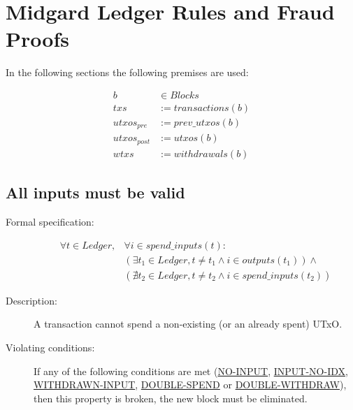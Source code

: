 \documentclass[../midgard.tex]{subfiles}
\begin{document}
\section{Midgard Ledger Rules and Fraud Proofs}
\label{h:ledger-rules-fraud-proofs}

In the following sections the following premises are used:

\begin{equation*}
\begin{split}
           b & \in Blocks          \\
         txs & := transactions(b)  \\
 utxos_{pre} & := prev\_utxos(b)   \\
utxos_{post} & := utxos(b)         \\
        wtxs & := withdrawals(b)
\end{split}
\end{equation*}

\subsection{All inputs must be valid}
\label{rule:all-inputs-must-be-valid}

\begin{description}

\item[Formal specification:]
\begin{equation*}
\begin{split}
    \forall t \in Ledger, &\forall i \in spend\_inputs(t): \\
    &( \exists t_1 \in Ledger, t \neq t_1 \land i \in outputs(t_1) ) \land \\
    &( \nexists t_2 \in Ledger, t \neq t_2 \land i \in spend\_inputs(t_2) )
\end{split}
\end{equation*}

\item[Description:] A transaction cannot spend a non-existing (or an already spent) UTxO.
\item[Violating conditions:] If any of the following conditions are met (\hyperref[violation:NO-INPUT]{NO-INPUT}, \hyperref[violation:INPUT-NO-IDX]{INPUT-NO-IDX}, \hyperref[violation:WITHDRAWN-INPUT]{WITHDRAWN-INPUT}, \hyperref[violation:DOUBLE-SPEND]{DOUBLE-SPEND} or \hyperref[violation:DOUBLE-WITHDRAW]{DOUBLE-WITHDRAW}), then this property is broken, the new block must be eliminated.

\end{description}
\end{document}
